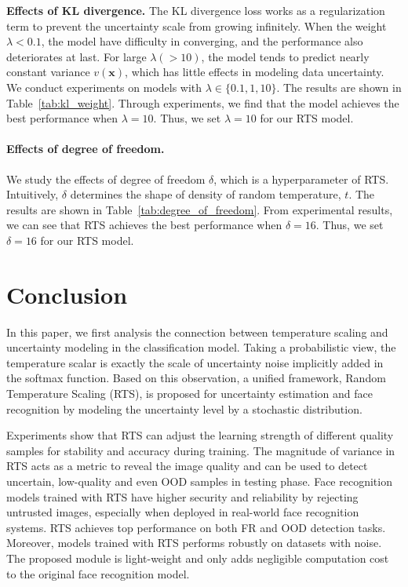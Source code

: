 \documentclass[letterpaper]{article} %
\begin{document}
\textbf{Effects of KL divergence.} The KL divergence loss works as a regularization term to prevent the uncertainty scale from growing infinitely. When the weight $\lambda < 0.1$, the model have difficulty in converging, and the performance also deteriorates at last.
For large $\lambda (>10)$, the model tends to predict nearly constant variance $v(\bm{x})$, which has little effects in modeling data uncertainty.
We conduct experiments on models with $\lambda \in \{0.1, 1, 10\}$. The results are shown in Table~\ref{tab:kl_weight}.
Through experiments, we find that the model achieves the best performance when $\lambda = 10$. Thus, we set $\lambda = 10$ for our RTS model.

\paragraph{Effects of degree of freedom.} We study the effects of degree of freedom $\delta$, which is a hyperparameter of RTS. Intuitively, $\delta$ determines the shape of density of random temperature, $t$. The results are shown in Table~\ref{tab:degree_of_freedom}. From experimental results, we can see that RTS achieves the best performance when $\delta = 16$. Thus, we set $\delta = 16$ for our RTS model.



\section{Conclusion}
\label{sec:conclusion}

In this paper, we first analysis the connection between temperature scaling and uncertainty modeling in the classification model. Taking a probabilistic view, the temperature scalar is exactly the scale of uncertainty noise implicitly added in the softmax function. Based on this observation, a unified framework, Random Temperature Scaling (RTS), is proposed for uncertainty estimation and face recognition by modeling the uncertainty level by a stochastic distribution.

Experiments show that RTS can adjust the learning strength of different quality samples for stability and accuracy during training. The magnitude of variance in RTS acts as a metric to reveal the image quality and can be used to detect uncertain, low-quality and even OOD samples in testing phase.
Face recognition models trained with RTS have higher security and reliability by rejecting untrusted images, especially when deployed in real-world face recognition systems. RTS achieves top performance on both FR and OOD detection tasks. Moreover, models trained with RTS performs robustly on datasets with noise. The proposed module is light-weight and only adds negligible computation cost to the original face recognition model.
\end{document}
